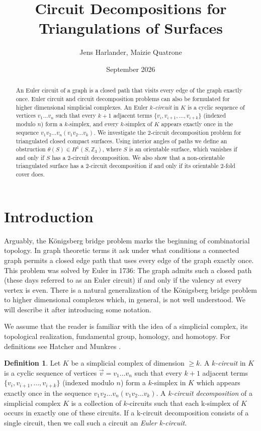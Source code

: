 \documentclass[12pt]{article}
\title{Circuit Decompositions for Triangulations of Surfaces}
\author{Jens Harlander, Maizie Quatrone}
\date{September 2026}
\theoremstyle{definition}
\newtheorem{definition}{Definition}
\begin{document}
\maketitle

\begin{abstract}
An Euler circuit of a graph is a closed path that visits every edge of the graph exactly once. Euler circuit and circuit decomposition problems can also be formulated for higher dimensional simplicial complexes. 
An Euler \textit{$k$-circuit} in $K$ is a cyclic sequence of vertices $v_1\dots v_n$ such that every $k+1$ adjacent terms $\{ v_i,v_{i+1},\dots,v_{i+k} \}$ (indexed modulo $n$) form a $k$-simplex, and every $k$-simplex of $K$ appears exactly once in the sequence $v_1v_2\ldots v_n(v_1v_2\ldots v_k)$. 
We investigate the 2-circuit decomposition problem for triangulated closed compact surfaces. Using interior angles of paths we define an obstruction $\theta(S)\in H^1(S,\mathbb Z_3)$, where $S$ is an orientable surface, which vanishes if and only if $S$ has a 2-circuit decomposition. We also show that a non-orientable triangulated surface has a 2-circuit decomposition if and only if its orientable 2-fold cover does.

\end{abstract}

\section{Introduction}

Arguably, the K\"onigsberg bridge problem \cite{wikipedia} marks the beginning of combinatorial topology. In graph theoretic terms it ask under what conditions a connected graph permits a closed edge path  that uses every edge of the graph exactly once. This problem was solved by Euler in 1736: The graph admits such a closed path (these days referred to as an Euler circuit) if and only if the valency at every vertex is even. There is a natural generalization of the K\"onigsberg bridge problem to higher dimensional complexes which, in general, is not well understood. We will describe it after introducing some notation.

We assume that the reader is familiar with the idea of a simplicial complex, its topological realization, fundamental group, homology, and homotopy. For definitions see Hatcher \cite{Hatcher} and Munkres \cite{Munkres}.

\begin{definition}
    Let $K$ be a simplicial complex of dimension $\ge k$. A \textit{$k$-circuit} in $K$ is a cyclic sequence of vertices $\vec v=v_1\dots v_n$ such that every $k+1$ adjacent terms $\{ v_i,v_{i+1},\dots,v_{i+k} \}$ (indexed modulo $n$) form a $k$-simplex in $K$ which appears exactly once in the sequence $v_1v_2\ldots v_n(v_1v_2\ldots v_k)$. A \textit{k-circuit decomposition} of a simplicial complex $K$ is a collection of $k$-circuits such that each k-simplex of $K$ occurs in exactly one of these circuits. If a k-circuit decomposition consists of a single circuit, then we call such a circuit an \textit{Euler k-circuit}.
\end{definition}
\end{document}
